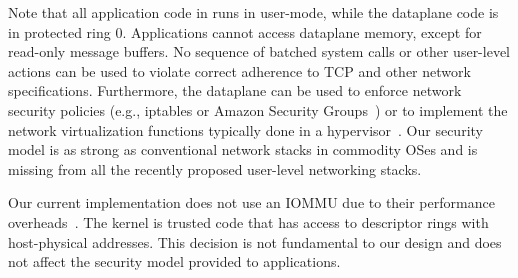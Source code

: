 Note that all application code in \ix runs in user-mode, while the
dataplane code is in protected ring 0. Applications cannot access
dataplane memory, except for read-only message buffers.  No sequence
of batched system calls or other user-level actions can be used to
violate correct adherence to TCP and other network specifications.
Furthermore, the dataplane can be used to enforce network security
policies (e.g., iptables or Amazon Security
Groups~\cite{url:amazon-sg}) or to implement the network
virtualization functions typically done in a
hypervisor~\cite{nsdi:nsx}. Our security model is as strong as
conventional network stacks in commodity OSes and is missing from all
the recently proposed user-level networking stacks.

Our current implementation does not use an IOMMU due to their
performance overheads~\cite{iommu:overhead}. The \ix kernel is trusted
code that has access to descriptor rings with host-physical addresses.
This decision is not fundamental to our design and does not affect the
security model provided to applications. 



